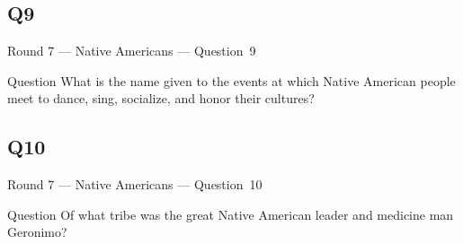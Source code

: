 \documentclass[11pt]{beamer}
\begin{document}
\subsection*{Q9}
\begin{frame}[t]{Round 7 --- Native Americans --- \mbox{Question 9}}
    \vspace{-0.5em}
    \begin{block}{Question}
        What is the name given to the events at which Native American people meet to dance, sing, socialize, and honor their cultures?
    \end{block}
\end{frame}
\subsection*{Q10}
\begin{frame}[t]{Round 7 --- Native Americans --- \mbox{Question 10}}
    \vspace{-0.5em}
    \begin{block}{Question}
        Of what tribe was the great Native American leader and medicine man Geronimo?
    \end{block}
\end{frame}
\end{document}

